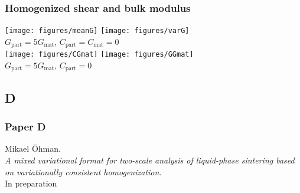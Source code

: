 \documentclass[11pt]{beamer} %
\begin{document}
\begin{frame}
 \frametitle{Homogenized shear and bulk modulus}
\begin{center}
%
\texttt{[image: figures/meanG]}
%
\texttt{[image: figures/varG]}
\\
$G_\mathrm{part} = 5 G_\mathrm{mat}$, $C_\mathrm{part} = C_\mathrm{mat} = 0$
\\%
%
\texttt{[image: figures/CGmat]}
%
\texttt{[image: figures/GGmat]}
\\
$G_\mathrm{part} = 5 G_\mathrm{mat}$, $C_\mathrm{part} = 0$
\end{center}
\end{frame}

\subsection{D}
\begin{frame}
 \frametitle{Paper D}
\begin{center}
Mikael Öhman.
\\[1em]
\textit{A mixed variational format for two-scale analysis of liquid-phase sintering based on variationally consistent homogenization}.
\\[1em]
In preparation
\end{center}
\end{frame}
\end{document}
